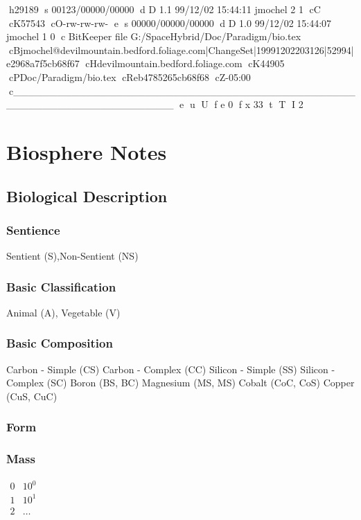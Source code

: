 h29189
s 00123/00000/00000
d D 1.1 99/12/02 15:44:11 jmochel 2 1
cC
cK57543
cO-rw-rw-rw-
e
s 00000/00000/00000
d D 1.0 99/12/02 15:44:07 jmochel 1 0
c BitKeeper file G:/SpaceHybrid/Doc/Paradigm/bio.tex
cBjmochel@devilmountain.bedford.foliage.com|ChangeSet|19991202203126|52994|e2968a7f5cb68f67
cHdevilmountain.bedford.foliage.com
cK44905
cPDoc/Paradigm/bio.tex
cReb4785265cb68f68
cZ-05:00
c______________________________________________________________________
e
u
U
f e 0
f x 33
t
T
I 2
\chapter{Biosphere Notes}
\section{Biological Description}

\subsection{Sentience}
Sentient (S),Non-Sentient (NS)

\subsection{Basic Classification}
Animal (A), Vegetable (V)

\subsection{Basic Composition}
Carbon - Simple (CS) 
Carbon - Complex (CC)
Silicon - Simple (SS)
Silicon - Complex (SC)
Boron (BS, BC)
Magnesium (MS, MS)
Cobalt (CoC, CoS)
Copper (CuS, CuC)

\subsection{Form}

\subsection{Mass}
    	\(
    	\begin{array}{ll}
		0		& 10^{0}  \\
		1		& 10^{1}  \\
		2		& \dots 
		\end{array}
        \)

